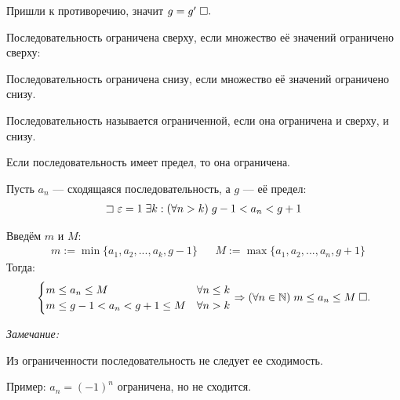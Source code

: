 \documentclass{article}
\begin{document}
Пришли к противоречию, значит $g=g'\qed$

\pagebreak


Последовательность ограничена сверху, если множество её значений ограничено сверху:

Последовательность ограничена снизу, если множество её значений ограничено снизу.

Последовательность называется ограниченной, если она ограничена и сверху, и снизу.

\theorem

Если последовательность имеет предел, то она ограничена.

\proof

Пусть $a_{n}$ --- сходящаяся последовательность, а $g$ --- её предел:
\begin{align*}
	\llet\eps=1\;\exists k:(\forall n>k)\;g-1<a_{n}<g+1
\end{align*}

Введём $m$ и $M$:
\begin{align*}
	 & m:=\min\{a_1,a_2,...,a_{k},g-1\} &  & M:=\max\{a_1,a_2,...,a_{n},g+1\}
\end{align*}
Тогда:
\begin{align*}
	\begin{cases}
		m\leq a_{n}\leq M         & \forall n\leq k \\
		m\leq g-1<a_{n}<g+1\leq M & \forall n>k
	\end{cases}\Rarr (\forall n\in\N)\;m\leq a_{n}\leq M\qed
\end{align*}

{\it Замечание:}

Из ограниченности последовательность не следует ее сходимость.

Пример: $a_n=(-1)^n$ ограничена, но не сходится.
\end{document}
